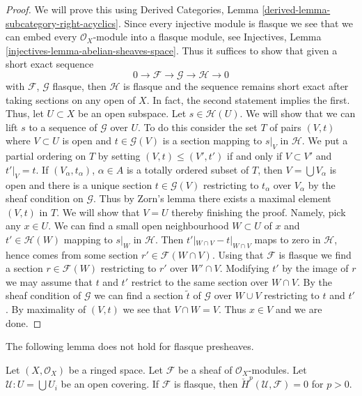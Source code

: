 \begin{proof}
We will prove this using
Derived Categories, Lemma \ref{derived-lemma-subcategory-right-acyclics}.
Since every injective module is flasque we see that we can embed
every $\mathcal{O}_X$-module into a flasque module, see
Injectives, Lemma \ref{injectives-lemma-abelian-sheaves-space}.
Thus it suffices to show that given a short exact sequence
$$
0 \to \mathcal{F} \to \mathcal{G} \to \mathcal{H} \to 0
$$
with $\mathcal{F}$, $\mathcal{G}$ flasque, then $\mathcal{H}$
is flasque and the sequence remains short exact after taking sections
on any open of $X$. In fact, the second statement implies the first.
Thus, let $U \subset X$ be an open subspace. Let $s \in \mathcal{H}(U)$.
We will show that we can lift $s$ to a sequence of $\mathcal{G}$
over $U$. To do this consider the set $T$ of pairs $(V, t)$
where $V \subset U$ is open and $t \in \mathcal{G}(V)$ is a section
mapping to $s|_V$ in $\mathcal{H}$.
We put a partial ordering on $T$ by setting
$(V, t) \leq (V', t')$ if and only if $V \subset V'$ and $t'|_V = t$.
If $(V_\alpha, t_\alpha)$, $\alpha \in A$
is a totally ordered subset of $T$, then $V = \bigcup V_\alpha$
is open and there is a unique section $t \in \mathcal{G}(V)$
restricting to $t_\alpha$ over $V_\alpha$ by the sheaf condition on
$\mathcal{G}$. Thus by Zorn's lemma there exists a maximal element
$(V, t)$ in $T$. We will show that $V = U$ thereby finishing the proof.
Namely, pick any $x \in U$. We can find a small open neighbourhood
$W \subset U$ of $x$ and $t' \in \mathcal{H}(W)$ mapping to $s|_W$
in $\mathcal{H}$. Then $t'|_{W \cap V} - t|_{W \cap V}$ maps to
zero in $\mathcal{H}$, hence comes from some section
$r' \in \mathcal{F}(W \cap V)$. Using that $\mathcal{F}$ is flasque
we find a section $r \in \mathcal{F}(W)$ restricting to $r'$
over $W' \cap V$. Modifying $t'$ by the image of $r$ we may
assume that $t$ and $t'$ restrict to the same section over
$W \cap V$. By the sheaf condition of $\mathcal{G}$
we can find a section $\tilde t$ of $\mathcal{G}$ over
$W \cup V$ restricting to $t$ and $t'$.
By maximality of $(V, t)$ we see that $V \cap W = V$.
Thus $x \in V$ and we are done.
\end{proof}

\noindent
The following lemma does not hold for flasque presheaves.

\begin{lemma}
\label{lemma-flasque-acyclic-cech}
Let $(X, \mathcal{O}_X)$ be a ringed space.
Let $\mathcal{F}$ be a sheaf of $\mathcal{O}_X$-modules.
Let $\mathcal{U} : U = \bigcup U_i$ be an open covering.
If $\mathcal{F}$ is flasque, then
$\check{H}^p(\mathcal{U}, \mathcal{F}) = 0$ for $p > 0$.
\end{lemma}

